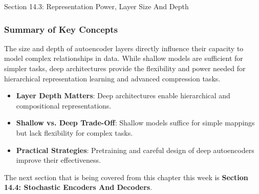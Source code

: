 \begin{notes}{Section 14.3: Representation Power, Layer Size And Depth}
    \subsubsection*{Summary of Key Concepts}
    
    The size and depth of autoencoder layers directly influence their capacity to model complex relationships in data. While shallow models are sufficient for simpler tasks, deep architectures provide the 
    flexibility and power needed for hierarchical representation learning and advanced compression tasks.
    
    \begin{highlight}
        \begin{itemize}
            \item \textbf{Layer Depth Matters}: Deep architectures enable hierarchical and compositional representations.
            \item \textbf{Shallow vs. Deep Trade-Off}: Shallow models suffice for simple mappings but lack flexibility for complex tasks.
            \item \textbf{Practical Strategies}: Pretraining and careful design of deep autoencoders improve their effectiveness.
        \end{itemize}
    \end{highlight}
\end{notes}

The next section that is being covered from this chapter this week is \textbf{Section 14.4: Stochastic Encoders And Decoders}.

